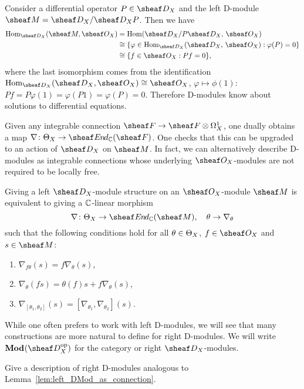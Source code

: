 \documentclass[number-in-sections,a4paper]{notes}
\begin{document}
\begin{Example}\label{ex:sol_fct}
    Consider a differential operator $P \in \sD_X$ and the left D-module $\sheaf M = \sD_X/\sD_XP$.
    Then we have
    \begin{align*}
        \Hom_{\sD_X}(\sheaf M, \sO_X) & = \Hom(\sD_X/P\sD_X,\, \sO_X) \\
        & \cong \{ \varphi \in \Hom_{\sD_X}(\sD_X,\, \sO_X) : \varphi(P) = 0 \} \\
        & \cong \{ f \in \sO_X : Pf = 0 \},
    \end{align*}
    where the last isomorphism comes from the identification $\Hom_{\sD_X}(\sD_X, \sO_X) \cong \sO_X$, $\varphi \mapsto \phi(1)$: $Pf = P\varphi(1) = \varphi(P1) = \varphi(P) = 0$.
    Therefore D-modules know about solutions to differential equations.
\end{Example}
    
Given any integrable connection $\sheaf F \to \sheaf F \otimes \ctb X$, one dually obtains a map $\nabla\colon \tb X \to \sheafEnd_\CC(\sheaf F)$.
One checks that this can be upgraded to an action of $\sD_X$ on $\sheaf M$.
In fact, we can alternatively describe D-modules as integrable connections whose underlying $\sO_X$-modules are not required to be locally free.

\begin{Lemma}\label{lem:left_DMod_as_connection}
    Giving a left $\sD_X$-module structure on an $\sO_X$-module $\sheaf M$ is equivalent to giving a ${\mathbb{C}}$-linear morphism
    \[
        \nabla\colon \tb X \to \sheafEnd_\CC(\sheaf M), \quad \theta \to \nabla_\theta
    \]
    such that the following conditions hold for all $\theta \in \Theta_{X}$, $f \in \sO_X$ and $s \in \sheaf M$:
    \begin{enumerate}
        \item $\nabla_{f\theta}(s) = f\nabla_{\theta}(s)$,
        \item $\nabla_\theta(fs) = \theta(f)s + f\nabla_\theta(s)$,
        \item $\nabla_{[\theta_1,\theta_2]}(s) = [\nabla_{\theta_1},\nabla_{\theta_2}](s)$.
    \end{enumerate}
\end{Lemma}

While one often prefers to work with left D-modules, we will see that many constructions are more natural to define for right D-modules.
We will write $\catrDMod{X}$ for the category or right $\sD_X$-modules.

\begin{Exercise}
    Give a description of right D-modules analogous to Lemma~\ref{lem:left_DMod_as_connection}.
\end{Exercise}
\end{document}
